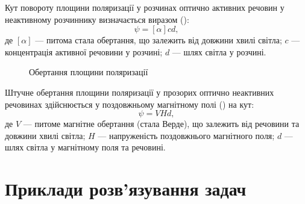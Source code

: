 Кут повороту площини поляризації у розчинах оптично активних
речовин у неактивному розчиннику визначається виразом ():
\begin{equation}\label{eq:Bio}
    \psi = [\alpha] cd,
\end{equation}
де $ [\alpha] $ --- питома стала обертання, що залежить від довжини хвилі світла; $ c $ --- концентрація активної речовини у розчині; $ d $ --- шлях світла у розчині.

\begin{figure}[h!]\centering

\caption{Обертання площини поляризації}
\label{pic:polarisation_plane_rotation}
\end{figure}

Штучне обертання площини поляризації у прозорих оптично
неактивних речовинах здійснюється у поздовжньому магнітному полі
() на кут:
\begin{equation}\label{eq:Faraday_effect}
    \psi = VHd,
\end{equation}
де $ V $ --- питоме магнітне обертання (стала Верде), що залежить від речовини
та довжини хвилі світла; $ H $ --- напруженість поздовжнього магнітного поля;
$ d $ --- шлях світла у магнітному поля та речовині.



\section{Приклади розв’язування задач}


